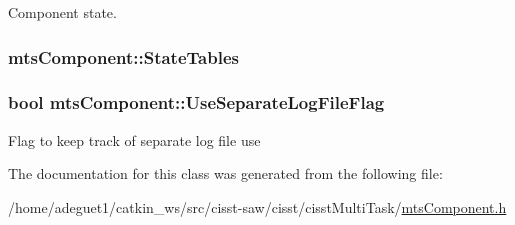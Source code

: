 Component state. \hypertarget{classmts_component_abe07b3be754d3f14a8454b21f160b537}{
\subsubsection[{State\-Tables}]{ mts\-Component\-::\-State\-Tables\hspace{0.3cm}{\ttfamily [protected]}}}\label{classmts_component_abe07b3be754d3f14a8454b21f160b537}
\hypertarget{classmts_component_a12390c92b351b911b723158e636a9e5a}{
\subsubsection[{Use\-Separate\-Log\-File\-Flag}]{\setlength{\rightskip}{0pt plus 5cm}bool mts\-Component\-::\-Use\-Separate\-Log\-File\-Flag\hspace{0.3cm}{\ttfamily [protected]}}}\label{classmts_component_a12390c92b351b911b723158e636a9e5a}
Flag to keep track of separate log file use 

The documentation for this class was generated from the following file\-:\begin{DoxyCompactItemize}
\item 
/home/adeguet1/catkin\-\_\-ws/src/cisst-\/saw/cisst/cisst\-Multi\-Task/\hyperlink{mts_component_8h}{mts\-Component.\-h}\end{DoxyCompactItemize}

